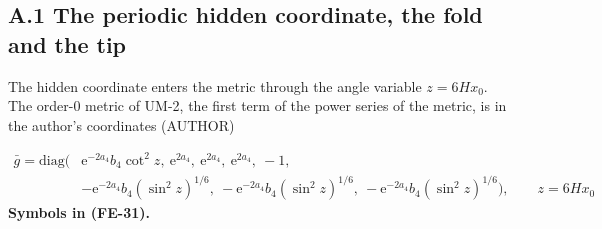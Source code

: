 \documentclass[
  10pt,
]{article}
\begin{document}
\hypertarget{a.1-the-periodic-hidden-coordinate-the-fold-and-the-tip}{%
\subsection*{A.1 The periodic hidden coordinate, the fold and the
tip}\label{a.1-the-periodic-hidden-coordinate-the-fold-and-the-tip}}

The hidden coordinate enters the metric through the angle variable
\(z = 6Hx_0\). The order-0 metric of UM-2, the first term of the power
series of the metric, is in the author's coordinates (AUTHOR)

\[
\begin{aligned}
\bar g = \mathrm{diag}\Big(&\mathrm{e}^{-2a_4}b_4\cot^2z,\ \mathrm{e}^{2a_4},\ \mathrm{e}^{2a_4},\ 
 \mathrm{e}^{2a_4},\ -1,\\
&-\mathrm{e}^{-2a_4}b_4(\sin^2z)^{1/6},\ -\mathrm{e}^{-2a_4}b_4(\sin^2z)^{1/6},\ -\mathrm{e}^{-2a_4}b_4(
 \sin^2z)^{1/6}\Big),
 \qquad z = 6Hx_0
\end{aligned} \tag{FE-31}
\] \textbf{Symbols in (FE-31).}
\end{document}
